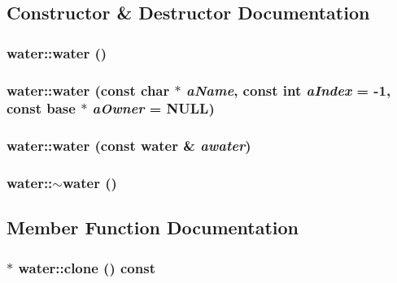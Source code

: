 \subsection{Constructor \& Destructor Documentation}
\hypertarget{classwater_a0b78bb6c3760b5d3e560224e540f988e}{
\subsubsection[{water}]{\setlength{\rightskip}{0pt plus 5cm}water::water ()}}
\label{classwater_a0b78bb6c3760b5d3e560224e540f988e}
\hypertarget{classwater_a29748f38fa7f940a045e62bc1d987f27}{
\subsubsection[{water}]{\setlength{\rightskip}{0pt plus 5cm}water::water (const char $\ast$ {\em aName}, \/  const int {\em aIndex} = {\ttfamily -\/1}, \/  const {\bf base} $\ast$ {\em aOwner} = {\ttfamily NULL})}}
\label{classwater_a29748f38fa7f940a045e62bc1d987f27}
\hypertarget{classwater_a20122d81fff5135054604e7ebc63bc7b}{
\subsubsection[{water}]{\setlength{\rightskip}{0pt plus 5cm}water::water (const {\bf water} \& {\em awater})}}
\label{classwater_a20122d81fff5135054604e7ebc63bc7b}
\hypertarget{classwater_acb7ca46dc51e8ed1855826d84ebb255e}{
\subsubsection[{$\sim$water}]{\setlength{\rightskip}{0pt plus 5cm}water::$\sim$water ()}}
\label{classwater_acb7ca46dc51e8ed1855826d84ebb255e}


\subsection{Member Function Documentation}
\hypertarget{classwater_ad3802425a88e7734530ac3d13feac437}{
\subsubsection[{clone}]{ $\ast$ water::clone () const}}
\label{classwater_ad3802425a88e7734530ac3d13feac437}


